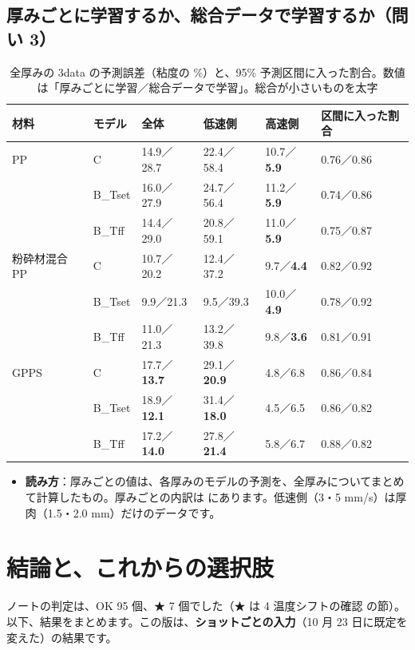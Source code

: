 \documentclass[paper=a4paper,fontsize=10.5pt,line_length=44zw,number_of_lines=38]{jlreq}
\newcommand{\file}[1]{\texttt{\detokenize{#1}}}
\newenvironment{points}{\begin{itemize}[label=$\triangleright$,leftmargin=1.5\zw,itemsep=0.3ex,topsep=0.5ex,parsep=0pt]}{\end{itemize}}
\newcommand{\pt}[1]{\item \textbf{#1}：}
\begin{document}
\subsection{厚みごとに学習するか、総合データで学習するか（問い 3）}
\begin{table}[H]
\caption{全厚みの 3data の予測誤差（粘度の \%）と、95\% 予測区間に入った割合。数値は「厚みごとに学習／総合データで学習」。総合が小さいものを太字}\label{tab:tt}
\scriptsize
\begin{tabularx}{\linewidth}{@{}llXXXX@{}}
\toprule
材料 & モデル & 全体 & 低速側 & 高速側 & 区間に入った割合 \\
\midrule
PP & C & 14.9／28.7 & 22.4／58.4 & 10.7／\textbf{5.9} & 0.76／0.86 \\
 & B\_Tset & 16.0／27.9 & 24.7／56.4 & 11.2／\textbf{5.9} & 0.74／0.86 \\
 & B\_Tff & 14.4／29.0 & 20.8／59.1 & 11.0／\textbf{5.9} & 0.75／0.87 \\
\midrule
粉砕材混合 PP & C & 10.7／20.2 & 12.4／37.2 & 9.7／\textbf{4.4} & 0.82／0.92 \\
 & B\_Tset & 9.9／21.3 & 9.5／39.3 & 10.0／\textbf{4.9} & 0.78／0.92 \\
 & B\_Tff & 11.0／21.3 & 13.2／39.8 & 9.8／\textbf{3.6} & 0.81／0.91 \\
\midrule
GPPS & C & 17.7／\textbf{13.7} & 29.1／\textbf{20.9} & 4.8／6.8 & 0.86／0.84 \\
 & B\_Tset & 18.9／\textbf{12.1} & 31.4／\textbf{18.0} & 4.5／6.5 & 0.86／0.82 \\
 & B\_Tff & 17.2／\textbf{14.0} & 27.8／\textbf{21.4} & 5.8／6.7 & 0.88／0.82 \\

\bottomrule
\end{tabularx}
\end{table}
\begin{points}
\pt{読み方}厚みごとの値は、各厚みのモデルの予測を、全厚みについてまとめて計算したもの。厚みごとの内訳は \file{厚みごとと総合の比較.csv} にあります。低速側（3・5 mm/s）は厚肉（1.5・2.0 mm）だけのデータです。
\end{points}


\section{結論と、これからの選択肢}


ノートの判定は、OK 95 個、★ 7 個でした（★ は 4 温度シフトの確認 の節）。以下、結果をまとめます。この版は、\textbf{ショットごとの入力}（10 月 23 日に既定を変えた）の結果です。
\end{document}
